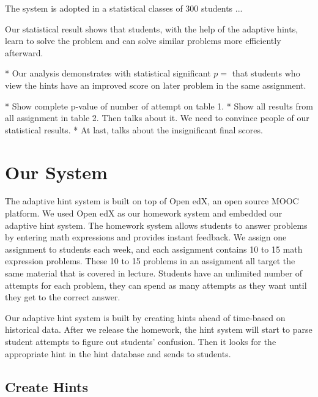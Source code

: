 \documentclass{article} %
\begin{document}
The system is adopted in a statistical classes of 300 students ...

Our statistical result shows that students, with the help of the adaptive hints, learn to solve the problem and can solve similar problems more efficiently afterward.

* Our analysis demonstrates with statistical significant $p=$ that students who view the hints have an improved score on later problem in the same assignment.

* Show complete p-value of number of attempt on table 1.
* Show all results from all assignment in table 2. Then talks about it. We need to convince people of our statistical results.
* At last, talks about the insignificant final scores.

\section{Our System}
The adaptive hint system is built on top of Open edX, an open source MOOC platform. We used Open edX as our homework system and embedded our adaptive hint system. The homework system allows students to answer problems by entering math expressions and provides instant feedback. We assign one assignment to students each week, and each assignment contains 10 to 15 math expression problems. These 10 to 15 problems in an assignment all target the same material that is covered in lecture. Students have an unlimited number of attempts for each problem, they can spend as many attempts as they want until they get to the correct answer.

Our adaptive hint system is built by creating hints ahead of time-based on historical data. After we release the homework, the hint system will start to parse student attempts to figure out students' confusion. Then it looks for the appropriate hint in the hint database and sends to students.

\subsection*{Create Hints}
\end{document}
